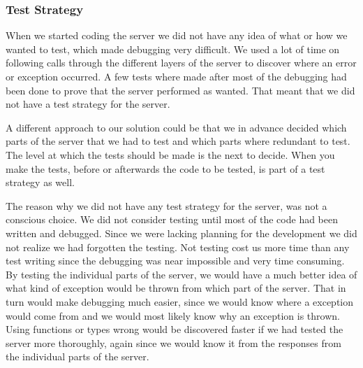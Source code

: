\subsubsection{Test Strategy}
When we started coding the server we did not have any idea of what or how we wanted to test, which made debugging very difficult.
We used a lot of time on following calls through the different layers of the server to discover where an error or exception occurred.
A few tests where made after most of the debugging had been done to prove that the server performed as wanted.
That meant that we did not have a test strategy for the server.

A different approach to our solution could be that we in advance decided which parts of the server that we had to test and which parts where redundant to test. The level at which the tests should be made is the next to decide. When you make the tests, before or afterwards the code to be tested, is part of a test strategy as well.

The reason why we did not have any test strategy for the server, was not a conscious choice. We did not consider testing until most of the code had been written and debugged. Since we were lacking planning for the development we did not realize we had forgotten the testing. Not testing cost us more time than any test writing since the debugging was near impossible and very time consuming. By testing the individual parts of the server, we would have a much better idea of what kind of exception would be thrown from which part of the server. That in turn would make debugging much easier, since we would know where a exception would come from and we would most likely know why an exception is thrown. Using functions or types wrong would be discovered faster if we had tested the server more thoroughly, again since we would know it from the responses from the individual parts of the server.
